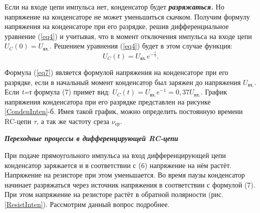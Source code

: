 \documentclass[14pt,a4paper]{article}
\begin{document}
Если на входе цепи импульса нет, конденсатор будет
\emph{\textbf{разряжаться.}} Но напряжение на конденсаторе не может уменьшиться скачком. Получим формулу напряжения на конденсаторе при его
разрядке, решив дифференциальное уравнение (\ref{eq4}) и учитывая, что в момент
отключения импульса на входе цепи \(U_{C}(0) = U_\text{вх.}.\) Решением уравнения (\ref{eq4}) будет в этом случае функция:
\begin{equation} \label{eq7}
  U_{C}(t) = U_\text{вх.}e^{- \frac{t}{\tau}}.
\end{equation}

Формула (\ref{eq7}) является формулой напряжения на конденсаторе при его разрядке, если в начальный момент конденсатор был заряжен до напряжения
\(U_\text{вх.}\). Если \emph{t=τ} формула (7) примет вид:
\(U_{C}(t) = U_\text{вх.}e^{- 1} = 0,37U_\text{вх.}\). График напряжения конденсатора при его разрядке представлен на рисунке \ref{CondenInten}-б. Имея такой график, можно определить постоянную времени RC-цепи $\tau$, а так же частоту среза $\nu_\text{ср}$.

\emph{\textbf{Переходные процессы в дифференцирующей RC-цепи}}

При подаче прямоугольного импульса на вход дифференцирующей цепи
конденсатор заряжается и в соответствии с (6) напряжение на нём растёт.
Напряжение на резисторе при этом уменьшается. Во время паузы конденсатор
начинает разряжаться через источник напряжения в соответствии с формулой
(7). При этом напряжение на резисторе растёт в обратной полярности
(рис. \ref{ResistInten}). Рассмотрим данный вопрос подробнее.
\end{document}
